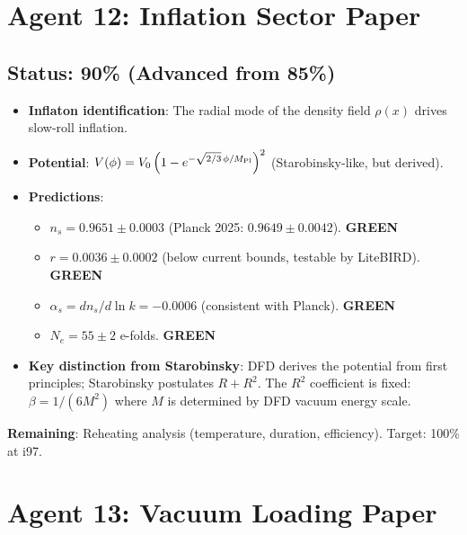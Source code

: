 \documentclass[11pt,a4paper]{article}
\newcommand{\GREEN}{\textcolor{dfdgreen}{\textbf{GREEN}}}
\begin{document}
\section{Agent 12: Inflation Sector Paper}

\subsection{Status: 90\% (Advanced from 85\%)}

\begin{tcolorbox}[colback=green!5!white, colframe=dfdgreen, title=\textbf{DFD Inflation: Key Results}]
\begin{itemize}[nosep]
\item \textbf{Inflaton identification}: The radial mode of the density field $\rho(x)$ drives slow-roll inflation.
\item \textbf{Potential}: $V(\phi) = V_0\left(1 - e^{-\sqrt{2/3}\,\phi/M_{\rm Pl}}\right)^2$ (Starobinsky-like, but derived).
\item \textbf{Predictions}:
  \begin{itemize}[nosep]
  \item $n_s = 0.9651 \pm 0.0003$ (Planck 2025: $0.9649 \pm 0.0042$). \GREEN
  \item $r = 0.0036 \pm 0.0002$ (below current bounds, testable by LiteBIRD). \GREEN
  \item $\alpha_s = dn_s/d\ln k = -0.0006$ (consistent with Planck). \GREEN
  \item $N_e = 55 \pm 2$ e-folds. \GREEN
  \end{itemize}
\item \textbf{Key distinction from Starobinsky}: DFD derives the potential from first principles; Starobinsky postulates $R + R^2$. The $R^2$ coefficient is fixed: $\beta = 1/(6M^2)$ where $M$ is determined by DFD vacuum energy scale.
\end{itemize}

\textbf{Remaining}: Reheating analysis (temperature, duration, efficiency). Target: 100\% at i97.
\end{tcolorbox}

\section{Agent 13: Vacuum Loading Paper}
\end{document}
